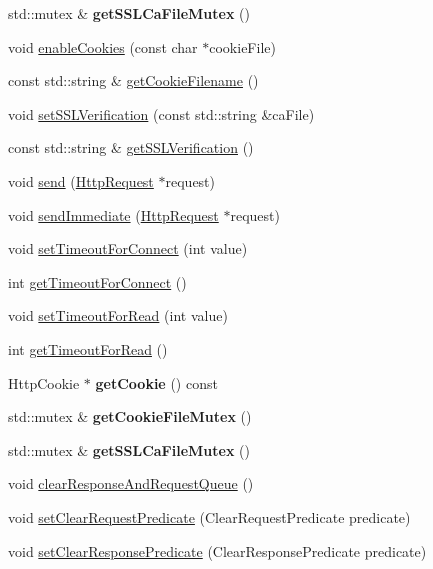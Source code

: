 \begin{DoxyCompactItemize}
std\+::mutex \& {\bfseries get\+S\+S\+L\+Ca\+File\+Mutex} ()
\item 
void \hyperlink{classnetwork_1_1HttpClient_a522608f82b2dad340931c2d83265a1bf}{enable\+Cookies} (const char $\ast$cookie\+File)
\item 
const std\+::string \& \hyperlink{classnetwork_1_1HttpClient_a502f57c5fa481e85d33b1eeaa4f8dc8e}{get\+Cookie\+Filename} ()
\item 
void \hyperlink{classnetwork_1_1HttpClient_a55b52ba7821dd0520eed769123df1f16}{set\+S\+S\+L\+Verification} (const std\+::string \&ca\+File)
\item 
const std\+::string \& \hyperlink{classnetwork_1_1HttpClient_adce8601485f9c5051278723a21af500b}{get\+S\+S\+L\+Verification} ()
\item 
void \hyperlink{classnetwork_1_1HttpClient_a912e8ba506a485bf5fcc2d06293f118b}{send} (\hyperlink{classnetwork_1_1HttpRequest}{Http\+Request} $\ast$request)
\item 
void \hyperlink{classnetwork_1_1HttpClient_a1a8920937cbbbcdc17f64ad431ac9c63}{send\+Immediate} (\hyperlink{classnetwork_1_1HttpRequest}{Http\+Request} $\ast$request)
\item 
void \hyperlink{classnetwork_1_1HttpClient_a1cf782d82d843941ea049e6fe8d6d231}{set\+Timeout\+For\+Connect} (int value)
\item 
int \hyperlink{classnetwork_1_1HttpClient_abbc0c505d0d0a323d049a26f35c38329}{get\+Timeout\+For\+Connect} ()
\item 
void \hyperlink{classnetwork_1_1HttpClient_a30fa6578fdbe46651312fd7ead04981e}{set\+Timeout\+For\+Read} (int value)
\item 
int \hyperlink{classnetwork_1_1HttpClient_a3398cc5ce8e6780267cd9227425331f5}{get\+Timeout\+For\+Read} ()
\item 
\mbox{\label{classnetwork_1_1HttpClient_afef8932c5ac7e1fa82c5bfb7288f0bf8}} 
Http\+Cookie $\ast$ {\bfseries get\+Cookie} () const
\item 
\mbox{\label{classnetwork_1_1HttpClient_aab2e0b6eef1dddd744430241a040c2c5}} 
std\+::mutex \& {\bfseries get\+Cookie\+File\+Mutex} ()
\item 
\mbox{\label{classnetwork_1_1HttpClient_a3b669b262b2dc49db18909e1b8648fbb}} 
std\+::mutex \& {\bfseries get\+S\+S\+L\+Ca\+File\+Mutex} ()
\item 
void \hyperlink{classnetwork_1_1HttpClient_ad613c1b57bc56386255b36da94a3b18d}{clear\+Response\+And\+Request\+Queue} ()
\item 
void \hyperlink{classnetwork_1_1HttpClient_acb6100ab800ab4e574b088086eac9c18}{set\+Clear\+Request\+Predicate} (Clear\+Request\+Predicate predicate)
\item 
void \hyperlink{classnetwork_1_1HttpClient_a0c7a9013ab5e56bee8efef1c79062665}{set\+Clear\+Response\+Predicate} (Clear\+Response\+Predicate predicate)
\end{DoxyCompactItemize}
